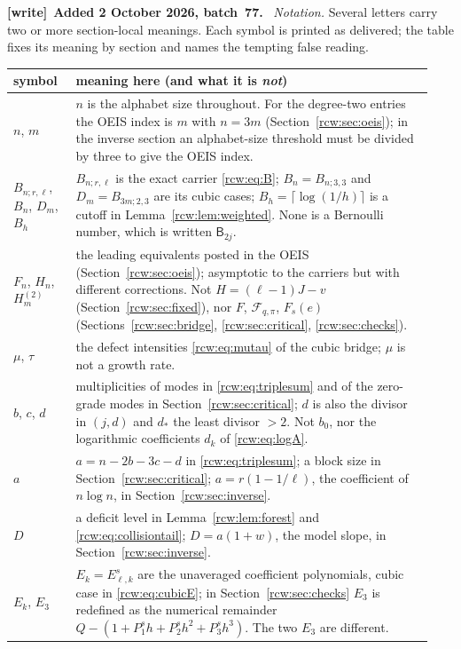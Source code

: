 \documentclass[11pt]{article}
\theoremstyle{definition}\newtheorem{definition}[theorem]{Definition}
\theoremstyle{remark}\newtheorem{remark}[theorem]{Remark}
\newenvironment{writenote}[1][]{\par\smallskip\begingroup\small
 \noindent\textbf{[write]}\if\relax\detokenize{#1}\relax\else~\textbf{#1.}\fi\ }%
 {\par\endgroup\smallskip}
\numberwithin{equation}{section}
\begin{document}
\begin{writenote}[Added 2 October 2026, batch~77]
\emph{Notation.} Several letters carry two or more section-local meanings.
Each symbol is printed as delivered; the table fixes its meaning by section
and names the tempting false reading.
\begin{center}\footnotesize
\begin{tabular}{@{}p{0.14\linewidth}p{0.80\linewidth}@{}}
\toprule
symbol & meaning here (and what it is \emph{not})\\
\midrule
$n$, $m$ & $n$ is the alphabet size throughout. For the degree-two entries the OEIS index is $m$ with $n=3m$ (Section~\ref{rcw:sec:oeis}); in the inverse section an alphabet-size threshold must be divided by three to give the OEIS index.\\
$B_{n;r,\ell}$, $B_n$, $D_m$, $B_h$ & $B_{n;r,\ell}$ is the exact carrier \eqref{rcw:eq:B}; $B_n=B_{n;3,3}$ and $D_m=B_{3m;2,3}$ are its cubic cases; $B_h=\lceil\log(1/h)\rceil$ is a cutoff in Lemma~\ref{rcw:lem:weighted}. None is a Bernoulli number, which is written $\mathsf B_{2j}$.\\
$F_n$, $H_n$, $H^{(2)}_m$ & the leading equivalents posted in the OEIS (Section~\ref{rcw:sec:oeis}); asymptotic to the carriers but with different corrections. Not $H=(\ell-1)J-v$ (Section~\ref{rcw:sec:fixed}), nor $F$, $\mathcal F_{q,\pi}$, $F_s(e)$ (Sections~\ref{rcw:sec:bridge}, \ref{rcw:sec:critical}, \ref{rcw:sec:checks}).\\
$\mu$, $\tau$ & the defect intensities \eqref{rcw:eq:mutau} of the cubic bridge; $\mu$ is not a growth rate.\\
$b$, $c$, $d$ & multiplicities of modes in \eqref{rcw:eq:triplesum} and of the zero-grade modes in Section~\ref{rcw:sec:critical}; $d$ is also the divisor in $(j,d)$ and $d_*$ the least divisor $>2$. Not $b_0$, nor the logarithmic coefficients $d_k$ of \eqref{rcw:eq:logA}.\\
$a$ & $a=n-2b-3c-d$ in \eqref{rcw:eq:triplesum}; a block size in Section~\ref{rcw:sec:critical}; $a=r(1-1/\ell)$, the coefficient of $n\log n$, in Section~\ref{rcw:sec:inverse}.\\
$D$ & a deficit level in Lemma~\ref{rcw:lem:forest} and \eqref{rcw:eq:collisiontail}; $D=a(1+w)$, the model slope, in Section~\ref{rcw:sec:inverse}.\\
$E_k$, $E_3$ & $E_k=E^s_{\ell,k}$ are the unaveraged coefficient polynomials, cubic case in \eqref{rcw:eq:cubicE}; in Section~\ref{rcw:sec:checks} $E_3$ is redefined as the numerical remainder $Q-(1+P_1^sh+P_2^sh^2+P_3^sh^3)$. The two $E_3$ are different.\\

\end{tabular}
\end{center}
\end{writenote}
\end{document}

